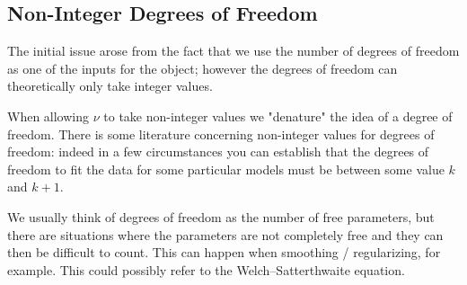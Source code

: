 \subsection{Non-Integer Degrees of Freedom}
The initial issue arose from the fact that we use the number of degrees of freedom as one of the inputs for the object; however the degrees of freedom can theoretically only take integer values.
\smallskip\par
When allowing $\nu$ to take non-integer values we "denature" the idea of a degree of freedom. There is some literature concerning non-integer values for degrees of freedom: indeed in a few circumstances you can establish that the degrees of freedom to fit the data for some particular models must be between some value $k$ and $k+1$.
\smallskip\par
We usually think of degrees of freedom as the number of free parameters, but there are situations where the parameters are not completely free and they can then be difficult to count. This can happen when smoothing / regularizing, for example. This could possibly refer to the Welch–Satterthwaite equation.